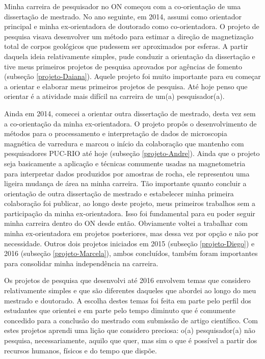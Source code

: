 Minha carreira de pesquisador no ON começou com a co-orientação 
de uma dissertação de mestrado. No ano seguinte, em 2014, assumi como orientador 
principal e minha ex-orientadora de doutorado como co-orientadora. 
O projeto de pesquisa visava desenvolver um método para estimar 
a direção de magnetização total de corpos geológicos que pudessem ser aproximados
por esferas. A partir daquela ideia relativamente simples, pude conduzir a orientação da 
dissertação e tive meus primeiros projetos de pesquisa aprovados por agências de fomento 
(subseção \ref{projeto-Daiana}). Aquele projeto foi muito importante para eu começar a 
orientar e elaborar meus primeiros projetos de pesquisa. Até hoje penso que orientar 
é a atividade mais difícil na carreira de um(a) pesquisador(a).

Ainda em 2014, comecei a orientar outra dissertação de mestrado, desta vez sem a 
co-orientação da minha ex-orientadora. O projeto propôs o desenvolvimento de métodos 
para o processamento e interpretação de dados de microscopia magnética de varredura e
marcou o início da colaboração que mantenho com pesquisadores PUC-RIO até hoje
(subseção \ref{projeto-Andre}). 
Ainda que o projeto seja basicamente a aplicação e técnicas comumente usadas na 
magnetometria para interpretar dados produzidos por amostras de rocha, ele representou 
uma ligeira mudança de área na minha carreira. Tão importante quanto concluir a 
orientação de outra dissertação de mestrado e estabelecer minha primeira colaboração foi 
publicar, ao longo deste projeto, meus primeiros trabalhos sem a participação da minha 
ex-orientadora. Isso foi fundamental para eu poder seguir minha carreira dentro do ON 
desde então. Obviamente voltei a trabalhar com minha ex-orientadora em projetos 
posteriores, mas dessa vez por opção e não por necessidade.
Outros dois projetos iniciados em 2015 (subseção \ref{projeto-Diego}) e 2016 
(subseção \ref{projeto-Marcela}), ambos concluídos, também foram importantes para 
consolidar minha independência na carreira.

Os projetos de pesquisa que desenvolvi até 2016 envolvem temas que considero 
relativamente simples e que são diferentes daqueles que abordei ao longo do meu 
mestrado e doutorado. A escolha destes temas foi feita em parte pelo perfil dos 
estudantes que orientei e em parte pelo tempo diminuto que é comumente concedido 
para a conclusão do mestrado com submissão de artigo científico. 
Com estes projetos aprendi uma lição que considero preciosa: o(a) pesquisador(a) 
não pesquisa, necessariamente, aquilo que quer, mas sim o que é possível a partir 
dos recursos humanos, físicos e do tempo que dispõe.

